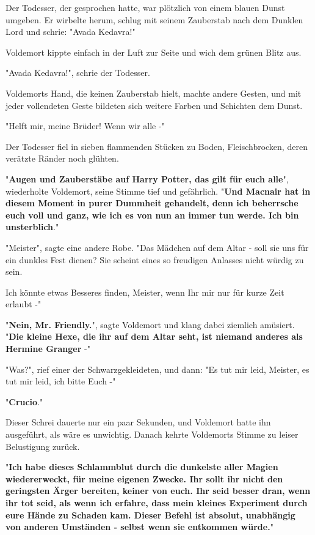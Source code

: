 {Der Todesser, der gesprochen hatte, war plötzlich von einem blauen Dunst umgeben. Er wirbelte herum, schlug mit seinem Zauberstab nach dem Dunklen Lord und schrie: "Avada Kedavra!"

Voldemort kippte einfach in der Luft zur Seite und wich dem grünen Blitz aus.

"Avada Kedavra!", schrie der Todesser.

Voldemorts Hand, die keinen Zauberstab hielt, machte andere Gesten, und mit jeder vollendeten Geste bildeten sich weitere Farben und Schichten dem Dunst.

"Helft mir, meine Brüder! Wenn wir alle -"

Der Todesser fiel in sieben flammenden Stücken zu Boden, Fleischbrocken, deren verätzte Ränder noch glühten.

"\textbf{Augen und Zauberstäbe auf Harry Potter, das gilt für euch alle}", wiederholte Voldemort, seine Stimme tief und gefährlich. "\textbf{Und Macnair hat in diesem Moment in purer Dummheit gehandelt, denn ich beherrsche euch voll und ganz, wie ich es von nun an immer tun werde. Ich bin unsterblich}."

"Meister", sagte eine andere Robe. "Das Mädchen auf dem Altar - soll sie uns für ein dunkles Fest dienen? Sie scheint eines so freudigen Anlasses nicht würdig zu sein.

Ich könnte etwas Besseres finden, Meister, wenn Ihr mir nur für kurze Zeit erlaubt -"

"\textbf{Nein, Mr. Friendly.}", sagte Voldemort und klang dabei ziemlich amüsiert. "\textbf{Die kleine Hexe, die ihr auf dem Altar seht, ist niemand anderes als Hermine Granger} -"

"Was?", rief einer der Schwarzgekleideten, und dann: "Es tut mir leid, Meister, es tut mir leid, ich bitte Euch -"

"\textbf{Crucio}."

Dieser Schrei dauerte nur ein paar Sekunden, und Voldemort hatte ihn ausgeführt, als wäre es unwichtig. Danach kehrte Voldemorts Stimme zu leiser Belustigung zurück.

"\textbf{Ich habe dieses Schlammblut durch die dunkelste aller Magien wiedererweckt, für meine eigenen Zwecke. Ihr sollt ihr nicht den geringsten Ärger bereiten, keiner von euch. Ihr seid besser dran, wenn ihr tot seid, als wenn ich erfahre, dass mein kleines Experiment durch eure Hände zu Schaden kam. Dieser Befehl ist absolut, unabhängig von anderen Umständen - selbst wenn sie entkommen würde.}"

}
